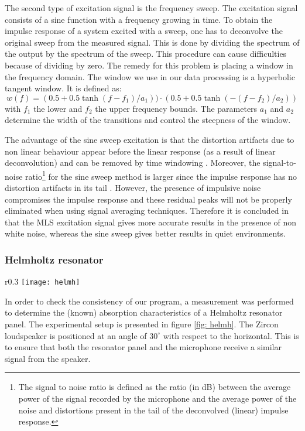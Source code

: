 The second type of excitation signal is the frequency sweep. The excitation signal consists of a sine function with a frequency growing in time. To obtain the impulse response of a system excited with a sweep, one has to deconvolve the original sweep from the measured signal. This is done by dividing the spectrum of the output by the spectrum of the sweep. This procedure can cause difficulties because of dividing by zero. The remedy for this problem is placing a window in the frequency domain. The window we use in our data processing is a hyperbolic tangent window. It is defined as:
\[
w(f) = (0.5 + 0.5 \tanh(f - f_1)/a_1)) \cdot (0.5 + 0.5 \tanh(-(f - f_2)/a_2))
\]
with $f_1$ the lower and $f_2$ the upper frequency bounds. The parameters $a_1$ and $a_2$ determine the width of the transitions and control the steepness of the window.

The advantage of the sine sweep excitation is that the distortion artifacts due to non linear behaviour appear before the linear response (as a result of linear deconvolution) and can be removed by time windowing \cite{Geetere}.  Moreover, the signal-to-noise ratio\footnote{The signal to noise ratio is defined as the ratio (in dB) between the average power of the signal recorded by the microphone and the average
power of the noise and distortions present in the tail of the deconvolved (linear) impulse response.} for the sine sweep method is larger since the impulse response has no distortion artifacts in its tail \cite{Stan}.   However, the presence of impulsive noise compromises the impulse response and these residual peaks will not be properly eliminated when using signal averaging techniques. Therefore it is concluded in \cite{Stan} that the MLS excitation signal gives more accurate results in  the presence of non white noise, whereas the sine sweep gives better results in quiet environments. 






\subsubsection{Helmholtz resonator}

\begin{wrapfigure}{r}{0.3\textwidth}
  \centering
    \texttt{[image: helmh]}
  \caption{Experimental setup for the measurement of the characteristics of the Helmholtz resonator panel.}
  \label{fig: helmh}
\end{wrapfigure}
In order to check the consistency of our program, a measurement was performed to determine the (known) absorption characteristics of a Helmholtz resonator panel. The experimental setup is presented in figure \ref{fig: helmh}. The Zircon loudspeaker is positioned at an angle of $30^{\circ}$ with  respect to the horizontal. This is to ensure that both the resonator panel and the microphone receive a similar signal from the speaker.

